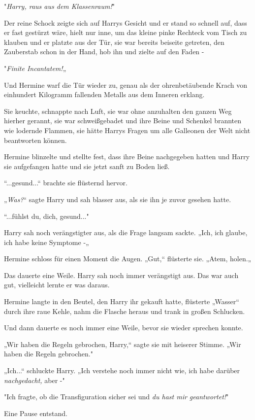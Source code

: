 {"\emph{Harry, raus aus dem Klassenraum!}"

Der reine Schock zeigte sich auf Harrys Gesicht und er stand so schnell auf, dass er fast gestürzt wäre, hielt nur inne, um das kleine pinke Rechteck vom Tisch zu klauben und er platzte aus der Tür, sie war bereits beiseite getreten, den Zauberstab schon in der Hand, hob ihn und zielte auf den Faden -

"\emph{Finite Incantatem!}„

Und Hermine warf die Tür wieder zu, genau als der ohrenbetäubende Krach von einhundert Kilogramm fallenden Metalls aus dem Inneren erklang.

Sie keuchte, schnappte nach Luft, sie war ohne anzuhalten den ganzen Weg hierher gerannt, sie war schweißgebadet und ihre Beine und Schenkel brannten wie lodernde Flammen, sie hätte Harrys Fragen um alle Galleonen der Welt nicht beantworten können.

Hermine blinzelte und stellte fest, dass ihre Beine nachgegeben hatten und Harry sie aufgefangen hatte und sie jetzt sanft zu Boden ließ.

“...gesund...“ brachte sie flüsternd hervor.

„\emph{Was?}“ sagte Harry und sah blasser aus, als sie ihn je zuvor gesehen hatte.

“...fühlst du, dich, gesund..."

Harry sah noch verängstigter aus, als die Frage langsam sackte. „Ich, ich glaube, ich habe keine Symptome -„

Hermine schloss für einen Moment die Augen. „Gut,“ flüsterte sie. „Atem, holen.„

Das dauerte eine Weile. Harry sah noch immer verängstigt aus. Das war auch gut, vielleicht lernte er was daraus.

Hermine langte in den Beutel, den Harry ihr gekauft hatte, flüsterte „Wasser“ durch ihre raue Kehle, nahm die Flasche heraus und trank in großen Schlucken.

Und dann dauerte es noch immer eine Weile, bevor sie wieder sprechen konnte.

„Wir haben die Regeln gebrochen, Harry,“ sagte sie mit heiserer Stimme. „Wir haben die Regeln gebrochen."

„Ich...“ schluckte Harry. „Ich verstehe noch immer nicht wie, ich habe darüber \emph{nachgedacht,} aber -"

"Ich fragte, ob die Transfiguration sicher sei und \emph{du hast mir geantwortet!}"

Eine Pause entstand.

}
